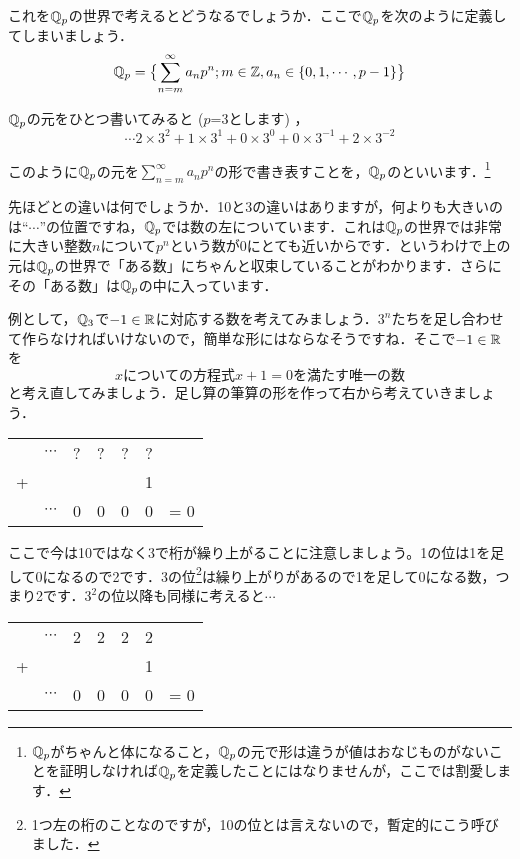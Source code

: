 \documentclass[./main]{subfiles}
\begin{document}
これを$\mathbb{Q}_p$の世界で考えるとどうなるでしょうか．ここで$\mathbb{Q}_p$を次のように定義してしまいましょう．
\[
\mathbb{Q}_p=\bigl\{ \sum^\infty_{n=m} a_n p^n ; m\in \mathbb{Z} , a_n \in \{ 0,1,\cdots ,p-1\} \bigr\}
\]

$\mathbb{Q}_p$の元をひとつ書いてみると ($p$=3とします) ，
\[
\cdots2 \times 3^2 + 1 \times 3^1 + 0 \times 3^0 + 0\times 3^{-1} + 2 \times 3^{-2}
\]

このように$\mathbb{Q}_p$の元を$\sum^\infty_{n=m} a_n p^n$の形で書き表すことを，$\mathbb{Q}_p$のといいます．\footnote{$\mathbb{Q}_p$がちゃんと体になること，$\mathbb{Q}_p$の元で形は違うが値はおなじものがないことを証明しなければ$\mathbb{Q}_p$を定義したことにはなりませんが，ここでは割愛します．}

先ほどとの違いは何でしょうか．10と3の違いはありますが，何よりも大きいのは``$\cdots$''の位置ですね，$\mathbb{Q}_p$では数の左についています．これは$\mathbb{Q}_p$の世界では非常に大きい整数$n$について$p^n$という数が0にとても近いからです．というわけで上の元は$\mathbb{Q}_p$の世界で「ある数」にちゃんと収束していることがわかります．さらにその「ある数」は$\mathbb{Q}_p$の中に入っています．

例として，$\mathbb{Q}_3$で$-1\in\mathbb{R}$に対応する数を考えてみましょう．$3^n$たちを足し合わせて作らなければいけないので，簡単な形にはならなそうですね．そこで$-1\in\mathbb{R}$を
\[
xについての方程式 x+1=0 を満たす唯一の数
\]
と考え直してみましょう．足し算の筆算の形を作って右から考えていきましょう．

\begin{center}
\begin{tabular}{ccccccr}
	 &$\cdots$&?&?&?&?& \\ 
	+& & & & &1& \\ \cline{1-6} 
	 &$\cdots$&0&0&0&0& = 0\\
\end{tabular}
\end{center}

ここで今は10ではなく3で桁が繰り上がることに注意しましょう。1の位は1を足して0になるので2です．3の位\footnote{1つ左の桁のことなのですが，10の位とは言えないので，暫定的にこう呼びました．}は繰り上がりがあるので1を足して0になる数，つまり2です．$3^2$の位以降も同様に考えると$\cdots$

\begin{center}
\begin{tabular}{ccccccr}
	 &$\cdots$&2&2&2&2& \\ 
	+& & & & &1& \\ \cline{1-6} 
	 &$\cdots$&0&0&0&0& = 0\\
\end{tabular}
\end{center}
\end{document}
